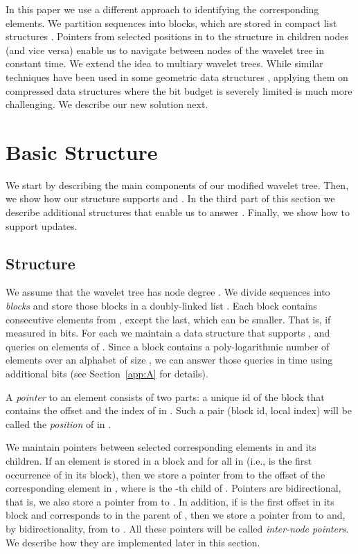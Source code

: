 \documentclass[11pt]{article}
\begin{document}
In this paper we use a different approach to identifying the 
corresponding elements. We partition sequences  into blocks, which are stored
in compact list structures . Pointers from selected positions 
in  to the structure  in children nodes  (and vice versa) 
enable us to navigate between nodes of the wavelet tree in constant time. We
extend the idea to multiary wavelet trees.
While similar techniques have been used in some geometric data structures 
\cite{N11,B08}, applying them on compressed data structures 
where the bit budget is severely limited  is much more challenging.
We describe our new solution next.


\section{Basic Structure}
\label{sec:basic}

We start by describing the main components of our modified 
wavelet tree. Then, we show how our structure supports 
 and . In the third part of this 
section we describe additional structures that enable us to 
answer . Finally, we show how to support updates. 

\subsection{Structure}

We assume that the wavelet tree  has node degree . 
We divide sequences  into {\em blocks} and store those blocks 
 in a doubly-linked list .  
Each block  contains  consecutive 
elements from , except the last, which can be smaller.
That is,  if measured in bits.
For each   we maintain a data structure  that supports ,  and  queries on elements of . Since a block contains a poly-logarithmic 
number of elements over an alphabet of size , we can answer those queries
in  time using  additional bits
(see Section~\ref{app:A} for details).

A \emph{pointer} to an element  consists of two parts:
a unique id of the block  that contains the offset  and 
the index of  in . Such a pair (block id, local index) will be
called the {\em position} of  in .

We maintain pointers between selected corresponding elements in  and its children.  
If  an element  is stored in a block  and 
 for all   in  (i.e.,  is the first
occurrence of  in its block), then we store 
a pointer from  to the offset  of the 
corresponding element  in ,
where  is the -th child of . 
Pointers are bidirectional, that is, we also store a pointer from  to .
In addition, if  is the first offset in its block and  
corresponds to  in the parent  of , then we store a pointer from
 to  and, by bidirectionality, from  to .
All these pointers will be called 
\emph{inter-node pointers}. 
We describe how they are implemented later in this section.
\end{document}
